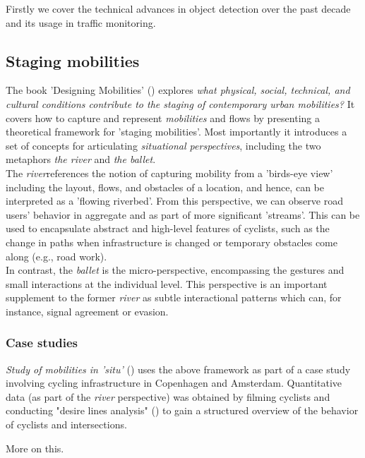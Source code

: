 \color{red}
Firstly we cover the technical advances in object detection over the past decade and its usage in traffic monitoring.
\color{black}

\subsection{Staging mobilities}
The book 'Designing Mobilities' (\cite{designinig_mobilities}) explores \textit{what physical, social, technical, and cultural conditions contribute to the staging of contemporary urban mobilities?} It covers how to capture and represent \textit{mobilities} and flows by presenting a theoretical framework for 'staging mobilities'. 
Most importantly it introduces a set of concepts for articulating \textit{situational perspectives},
 including the two metaphors \textit{the river} and \textit{the ballet}. 
 \ \\

 The \textit{river}references the notion of capturing mobility from a 'birds-eye view' including the layout, flows, and obstacles of a location, and hence, can be interpreted as a 'flowing riverbed'. From this perspective, we can observe road users' behavior in aggregate and as part of more significant 'streams'. This can be used to encapsulate abstract and high-level features of cyclists, such as the change in paths
 when infrastructure is changed or temporary obstacles come along (e.g., road work).
 \ \\

In contrast, the \textit{ballet} is the micro-perspective, encompassing the gestures and small interactions at the individual level.
This perspective is an important supplement to the former \textit{river} as subtle interactional patterns which can, for instance,
 signal agreement or evasion.

\subsubsection{Case studies}
\textit{Study of mobilities in 'situ'} (\cite{situ}) uses the above framework as part of a case study involving cycling infrastructure in 
Copenhagen and Amsterdam. Quantitative data (as part of the \textit{river} perspective) was obtained by filming cyclists and conducting 
"desire lines analysis" (\cite{cva}) to gain a structured overview of the behavior of cyclists and intersections. 

\color{red}
More on this.
\color{black}

